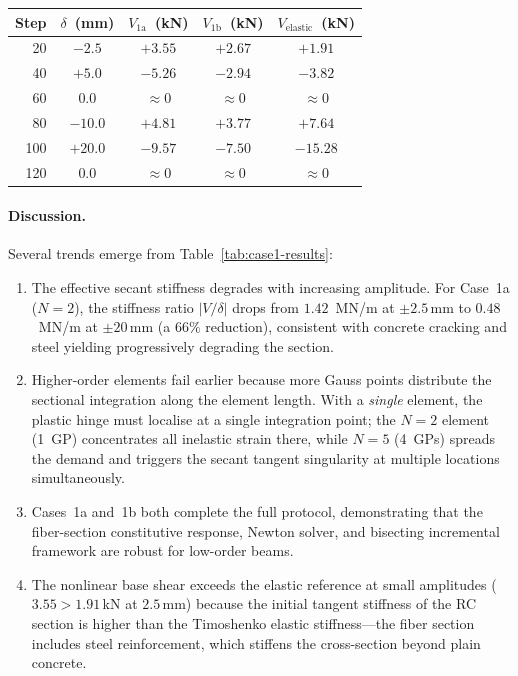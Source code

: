 \begin{center}
\begin{tabular}{rcccc}
\toprule
\textbf{Step} & $\delta$~(mm) &
  \multicolumn{1}{c}{$V_{1\text{a}}$~(kN)} &
  \multicolumn{1}{c}{$V_{1\text{b}}$~(kN)} &
  \multicolumn{1}{c}{$V_{\text{elastic}}$~(kN)} \\
\midrule
 20 & $-2.5$  & $+3.55$ & $+2.67$ & $+1.91$ \\
 40 & $+5.0$  & $-5.26$ & $-2.94$ & $-3.82$ \\
 60 & $0.0$   & $\approx 0$ & $\approx 0$ & $\approx 0$ \\
 80 & $-10.0$ & $+4.81$ & $+3.77$ & $+7.64$ \\
100 & $+20.0$ & $-9.57$ & $-7.50$ & $-15.28$ \\
120 & $0.0$   & $\approx 0$ & $\approx 0$ & $\approx 0$ \\
\bottomrule
\end{tabular}
\end{center}

\paragraph{Discussion.}
Several trends emerge from Table~\ref{tab:case1-results}:

\begin{enumerate}
  \item The effective secant stiffness degrades with increasing
    amplitude.  For Case~1a ($N=2$), the stiffness ratio
    $|V/\delta|$ drops from $1.42$~MN/m at $\pm 2.5$\,mm to
    $0.48$~MN/m at $\pm 20$\,mm (a $66\%$ reduction), consistent
    with concrete cracking and steel yielding progressively degrading
    the section.

  \item Higher-order elements fail earlier because more Gauss points
    distribute the sectional integration along the element length.
    With a \emph{single} element, the plastic hinge must localise at
    a single integration point; the $N=2$ element (1~GP) concentrates
    all inelastic strain there, while $N=5$ (4~GPs) spreads the demand
    and triggers the secant tangent singularity at multiple locations
    simultaneously.

  \item Cases~1a and~1b both complete the full protocol, demonstrating
    that the fiber-section constitutive response, Newton solver, and
    bisecting incremental framework are robust for low-order beams.

  \item The nonlinear base shear exceeds the elastic reference at
    small amplitudes ($3.55 > 1.91$\,kN at $2.5$\,mm) because the
    initial tangent stiffness of the RC section is higher than the
    Timoshenko elastic stiffness---the fiber section includes steel
    reinforcement, which stiffens the cross-section beyond plain
    concrete.
\end{enumerate}


